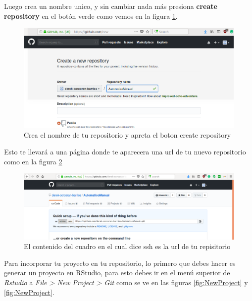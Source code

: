 \documentclass[]{book}
\begin{document}
Luego crea un nombre unico, y sin cambiar nada más presiona
\textbf{create repository} en el botón verde como vemos en la figura
\ref{fig:Name}.

\begin{figure}

{\centering \includegraphics[width=0.8\linewidth]{NombreRepo} 

}

\caption{Crea el nombre de tu repositorio y apreta el boton create repository}\label{fig:Name}
\end{figure}

Esto te llevará a una página donde te aparecera una url de tu nuevo
repositorio como en la figura \ref{fig:ssh}

\begin{figure}

{\centering \includegraphics[width=0.8\linewidth]{GitAdress} 

}

\caption{El contenido del cuadro en el cual dice ssh es la url de tu repisitorio}\label{fig:ssh}
\end{figure}

Para incorporar tu proyecto en tu repositorio, lo primero que debes
hacer es generar un proyecto en RStudio, para esto debes ir en el menú
superior de \emph{Rstudio} a \emph{File \textgreater{} New Project
\textgreater{} Git} como se ve en las figuras \ref{fig:NewProject} y
\ref{fig:NewProject}.
\end{document}
